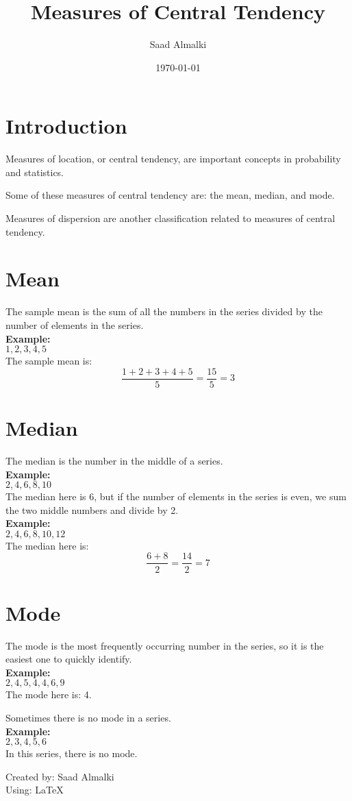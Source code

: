 \documentclass[12pt]{article}
\title{Measures of Central Tendency}
\author{Saad Almalki}
\date{\today}
\begin{document}
\maketitle

\section{Introduction} 
Measures of location, or central tendency, are important concepts in probability and statistics. 

Some of these measures of central tendency are: the mean, median, and mode.

Measures of dispersion are another classification related to measures of central tendency.

\section{Mean} 
The sample mean is the sum of all the numbers in the series divided by the number of elements in the series.\\
\textbf{Example:}\\
$1, 2, 3, 4, 5$ \\
The sample mean is: 
\[
\frac{1+2+3+4+5}{5} = \frac{15}{5} = 3
\]

\section{Median}
The median is the number in the middle of a series.\\
\textbf{Example:}\\
$2, 4, 6, 8, 10$ \\
The median here is 6, but if the number of elements in the series is even, we sum the two middle numbers and divide by 2.\\
\textbf{Example:}\\
$2, 4, 6, 8, 10, 12$ \\
The median here is:
\[
\frac{6 + 8}{2} = \frac{14}{2} = 7
\]

\section{Mode}
The mode is the most frequently occurring number in the series, so it is the easiest one to quickly identify.\\
\textbf{Example:}\\
$2, 4, 5, 4, 4, 6, 9$ \\
The mode here is: 4.

Sometimes there is no mode in a series.\\
\textbf{Example:}\\
$2, 3, 4, 5, 6$ \\
In this series, there is no mode.

\begin{flushright}
Created by: Saad Almalki \\
Using: \LaTeX
\end{flushright}
\end{document}
